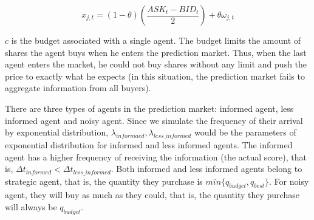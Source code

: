 \documentclass{article}
\begin{document}
        \begin{equation}
            x_{j,t}=(1-\theta)\left(\frac{ASK_t-BID_t}{2}\right)+\theta\omega_{j,t}
        \end{equation}
        
        $c$ is the budget associated with a single agent. The budget limits the amount of shares the agent buys when he enters the prediction market. Thus, when the last agent enters the market, he could not buy shares without any limit and push the price to exactly what he expects (in this situation, the prediction market fails to aggregate information from all buyers).
        
        There are three types of agents in the prediction market: informed agent, less informed agent and noisy agent. Since we simulate the frequency of their arrival by exponential distribution, $\lambda_{informaed}, \lambda_{less\_ informed}$ would be the parameters of exponential distribution for informed and less informed agents. The informed agent has a higher frequency of receiving the information (the actual score),  that is, $\Delta t_{informed}<\Delta t_{less\_informed}$. Both informed and less informed agents belong to strategic agent, that is, the quantity they purchase is $min\{q_{budget}, q_{best}\}$. For noisy agent, they will buy as much as they could, that is, the quantity they purchase will always be $q_{budget}$. 
\end{document}

